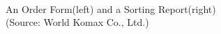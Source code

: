 \documentclass[a4paper]{amsart}
\numberwithin{equation}{section} %
\numberwithin{figure}{section} %
\numberwithin{table}{section}
\theoremstyle{plain}
\theoremstyle{definition}
\theoremstyle{plain}
\theoremstyle{plain}
\theoremstyle{plain}
\theoremstyle{plain}
\theoremstyle{plain}
\begin{document}
\begin{figure}[h!]
	\centering
	\\
	\caption{An Order Form(left) and a Sorting Report(right) \\(Source: World Komax Co., Ltd.)}
	\label{fig:Order_Sorting}       %
\end{figure}
\end{document}
